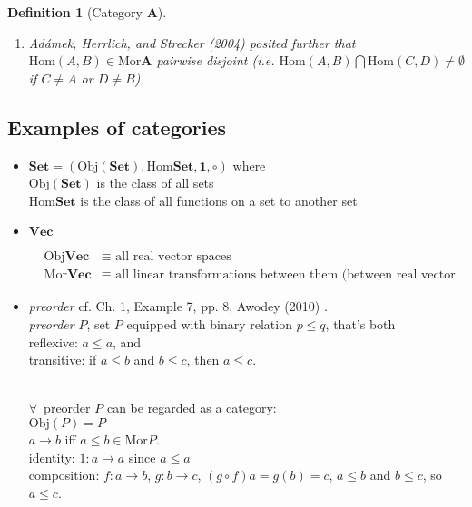 \documentclass[10pt]{amsart}
\newtheorem{definition}{Definition}
\begin{document}
\begin{multicols*}{2}
\begin{definition}[Category $\mathbf{A}$]
\begin{enumerate}
\begin{enumerate}
		$\forall \, f \in \text{Hom}_{\mathbf{A}}(A,B)$,
		\[
		\begin{tikzpicture}
		\matrix (m) [matrix of math nodes, row sep=3em, column sep=4em, minimum width=2em]
		{
			A & B  \\
		};
		\path[->]
		(m-1-1) edge node [above] {$f$} (m-1-2)
		edge [loop left] node [left] {$1_A$} (m-1-1)
		(m-1-2) edge [loop right] node [right] {$1_B$} (m-1-2)
		;
		\end{tikzpicture}
		\]
		\item Ad\'{a}mek, Herrlich, and Strecker (2004) \cite{AHS2004} posited further that $\text{Hom}(A,B) \in \text{Mor}\mathbf{A}$ pairwise disjoint (i.e. $\text{Hom}(A,B) \bigcap \text{Hom}(C,D) \neq \emptyset$ if $C\neq A$ or $D\neq B$)
	\end{enumerate}
\end{enumerate}	
\end{definition}

\subsection{Examples of categories}

\begin{itemize}
	\item $\textbf{Set} = (\text{Obj}{(\textbf{Set})}, \text{Hom}{\textbf{Set}},\mathbf{1},\circ)$ where \\
	$\text{Obj}{(\textbf{Set})}$ is the class of all sets \\
	$\text{Hom}{\textbf{Set}}$ is the class of all functions on a set to another set
	\item $\textbf{Vec}$
	
	\[
	\begin{aligned}
	& \text{Obj}\textbf{Vec} & \equiv \text{ all real vector spaces } \\ 
	& \text{Mor}\textbf{Vec} & \equiv \text{ all linear transformations between them (between real vector spaces) }
	\end{aligned}
	\]
	\item \emph{preorder} cf. Ch. 1, Example 7, pp. 8, Awodey (2010) \cite{Awod2010}. \\
	\emph{preorder} $P$, set $P$ equipped with binary relation $p\leq q $, that's both \\
	reflexive: $a\leq a$, and \\
	transitive: if $a \leq b$ and $b \leq c$, then $a\leq c$. 
	
	\quad \\
	$\forall \, $ preorder $P$ can be regarded as a category: \\
	$\text{Obj}(P) = P$ \\
	$a \to b$ iff $a\leq b \in \text{Mor}P$. \\
	identity: $1 :a \to a$ since $a\leq a$ \\
	composition: $f:a\to b$, $g:b\to c$, $(g\circ f)a = g(b) = c$, $a\leq b$ and $b\leq c$, so $a\leq c$. 
	

\end{itemize}
\end{multicols*}
\end{document}
